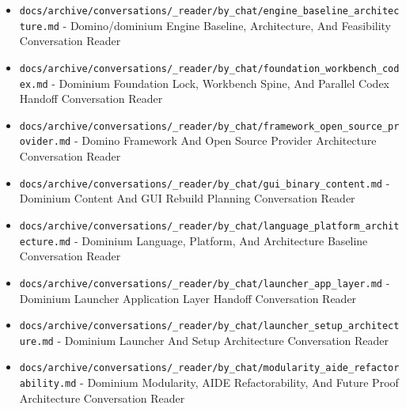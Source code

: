 \documentclass[10.5pt,a4paper,openany]{book}
\begin{document}
\begin{itemize}
\item \texttt{docs/\allowbreak{}archive/\allowbreak{}conversations/\allowbreak{}\_\allowbreak{}reader/\allowbreak{}by\_\allowbreak{}chat/\allowbreak{}engine\_\allowbreak{}baseline\_\allowbreak{}architecture.\allowbreak{}md} -\allowbreak{} Domino/\allowbreak{}dominium Engine Baseline, Architecture, And Feasibility Conversation Reader
\item \texttt{docs/\allowbreak{}archive/\allowbreak{}conversations/\allowbreak{}\_\allowbreak{}reader/\allowbreak{}by\_\allowbreak{}chat/\allowbreak{}foundation\_\allowbreak{}workbench\_\allowbreak{}codex.\allowbreak{}md} -\allowbreak{} Dominium Foundation Lock, Workbench Spine, And Parallel Codex Handoff Conversation Reader
\item \texttt{docs/\allowbreak{}archive/\allowbreak{}conversations/\allowbreak{}\_\allowbreak{}reader/\allowbreak{}by\_\allowbreak{}chat/\allowbreak{}framework\_\allowbreak{}open\_\allowbreak{}source\_\allowbreak{}provider.\allowbreak{}md} -\allowbreak{} Domino Framework And Open Source Provider Architecture Conversation Reader
\item \texttt{docs/\allowbreak{}archive/\allowbreak{}conversations/\allowbreak{}\_\allowbreak{}reader/\allowbreak{}by\_\allowbreak{}chat/\allowbreak{}gui\_\allowbreak{}binary\_\allowbreak{}content.\allowbreak{}md} -\allowbreak{} Dominium Content And GUI Rebuild Planning Conversation Reader
\item \texttt{docs/\allowbreak{}archive/\allowbreak{}conversations/\allowbreak{}\_\allowbreak{}reader/\allowbreak{}by\_\allowbreak{}chat/\allowbreak{}language\_\allowbreak{}platform\_\allowbreak{}architecture.\allowbreak{}md} -\allowbreak{} Dominium Language, Platform, And Architecture Baseline Conversation Reader
\item \texttt{docs/\allowbreak{}archive/\allowbreak{}conversations/\allowbreak{}\_\allowbreak{}reader/\allowbreak{}by\_\allowbreak{}chat/\allowbreak{}launcher\_\allowbreak{}app\_\allowbreak{}layer.\allowbreak{}md} -\allowbreak{} Dominium Launcher Application Layer Handoff Conversation Reader
\item \texttt{docs/\allowbreak{}archive/\allowbreak{}conversations/\allowbreak{}\_\allowbreak{}reader/\allowbreak{}by\_\allowbreak{}chat/\allowbreak{}launcher\_\allowbreak{}setup\_\allowbreak{}architecture.\allowbreak{}md} -\allowbreak{} Dominium Launcher And Setup Architecture Conversation Reader
\item \texttt{docs/\allowbreak{}archive/\allowbreak{}conversations/\allowbreak{}\_\allowbreak{}reader/\allowbreak{}by\_\allowbreak{}chat/\allowbreak{}modularity\_\allowbreak{}aide\_\allowbreak{}refactorability.\allowbreak{}md} -\allowbreak{} Dominium Modularity, AIDE Refactorability, And Future Proof Architecture Conversation Reader

\end{itemize}
\end{document}
